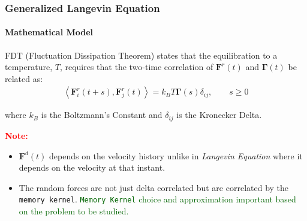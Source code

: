 \documentclass[a4paper,10pt]{beamer}
\newcommand{\BS}[1]{\boldsymbol{#1}}
\newcommand{\angbrac}[1]{\left \langle #1 \right \rangle}
\begin{document}
	\begin{frame}
		\small
		\frametitle{Generalized Langevin Equation}
		\framesubtitle{Mathematical Model}
		\begin{theorem}
			FDT (Fluctuation Dissipation Theorem) states that the equilibration to a temperature, $T$, requires that the two-time correlation of $\BS{F}^{r}(t)$ and $\BS{\Gamma}(t)$ be related as:
			\begin{align}
				\angbrac{\BS{F}^{r}_{i}(t+s),\BS{F}^{r}_{j}(t)} = k_{B} T \BS{\Gamma}(s) \delta_{ij}, \qquad s \geq 0
			\end{align}
		\end{theorem}
		where $k_{B}$ is the Boltzmann's Constant and $\delta_{ij}$ is the Kronecker Delta.
		\linebreak
		
		
		\textcolor{red}{\textbf{Note:}}
		\begin{itemize}
			\item {$\BS{F}^{d}(t)$ depends on the velocity history unlike in \textit{Langevin Equation}} where it depends on the velocity at that instant.
			\item {The random forces are not just delta correlated but are correlated by the \texttt{memory kernel}. \textcolor{darkgreen}{\texttt{Memory Kernel} choice and approximation important based on the problem to be studied.}}
		\end{itemize}
	\end{frame}
	
\end{document}
